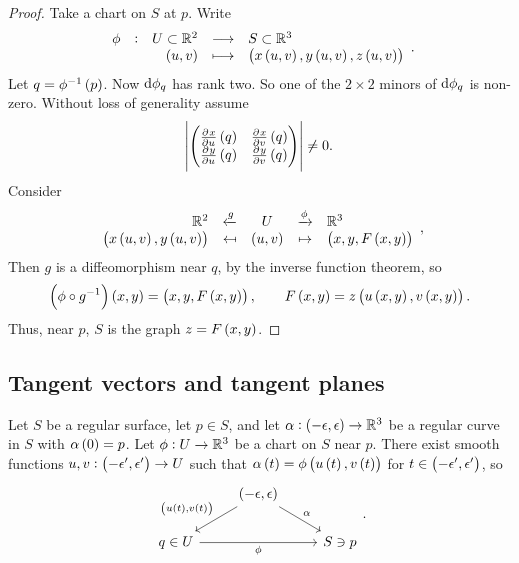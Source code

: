 \begin{proof}
Take a chart on $ S $ at $ p $. Write
$$ \function[\phi]{U \subset \RR^2}{S \subset \RR^3}{\br{u, v}}{\br{x\br{u, v}, y\br{u, v}, z\br{u, v}}}. $$
Let $ q = \phi^{-1}\br{p} $. Now $ \mathrm{d}\phi_q $ has rank two. So one of the $ 2 \times 2 $ minors of $ \mathrm{d}\phi_q $ is non-zero. Without loss of generality assume
$$ \abs{\twobytwo{\tpd{x}{u}\br{q}}{\tpd{x}{v}\br{q}}{\tpd{y}{u}\br{q}}{\tpd{y}{v}\br{q}}} \ne 0. $$
Consider
$$
\begin{array}{rcccl}
\RR^2 & \xleftarrow{g} & U & \xrightarrow{\phi} & \RR^3 \\
\br{x\br{u, v}, y\br{u, v}} & \mapsfrom & \br{u, v} & \mapsto & \br{x, y, F\br{x, y}}
\end{array},
$$
Then $ g $ is a diffeomorphism near $ q $, by the inverse function theorem, so
$$ \br{\phi \circ g^{-1}}\br{x, y} = \br{x, y, F\br{x, y}}, \qquad F\br{x, y} = z\br{u\br{x, y}, v\br{x, y}}. $$
Thus, near $ p $, $ S $ is the graph $ z = F\br{x, y} $.
\end{proof}

\pagebreak

\subsection{Tangent vectors and tangent planes}


\begin{proposition}
Let $ S $ be a regular surface, let $ p \in S $, and let $ \alpha : \br{-\epsilon, \epsilon} \to \RR^3 $ be a regular curve in $ S $ with $ \alpha\br{0} = p $. Let $ \phi : U \to \mathbb{R}^3 $ be a chart on $ S $ near $ p $. There exist smooth functions $ u, v : \br{-\epsilon', \epsilon'} \to U $ such that $ \alpha\br{t} = \phi\br{u\br{t}, v\br{t}} $ for $ t \in \br{-\epsilon', \epsilon'} $, so
$$
\begin{tikzcd}
& \br{-\epsilon, \epsilon} \arrow{dl}[swap]{\br{u\br{t}, v\br{t}}} \arrow{dr}{\alpha} & \\
q \in U \arrow{rr}[swap]{\phi} & & S \ni p
\end{tikzcd}.
$$
\end{proposition}

